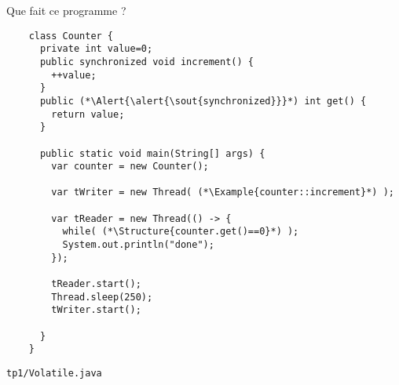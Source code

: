 
\begingroup

\begin{frame}[fragile]{Que fait ce programme ?}

  \begin{lstlisting}
    class Counter {
      private int value=0;
      public synchronized void increment() {
        ++value;
      }
      public (*\Alert{\alert{\sout{synchronized}}}*) int get() {
        return value;
      }

      public static void main(String[] args) {
        var counter = new Counter();
        
        var tWriter = new Thread( (*\Example{counter::increment}*) );

        var tReader = new Thread(() -> {
          while( (*\Structure{counter.get()==0}*) );
          System.out.println("done");
        });
        
        tReader.start();
        Thread.sleep(250);
        tWriter.start();
        
      }
    }
  \end{lstlisting}
  
  \begin{citing}
    \jitem \lstinline{tp1/Volatile.java}
  \end{citing}
\end{frame}

\endgroup
\endinput
